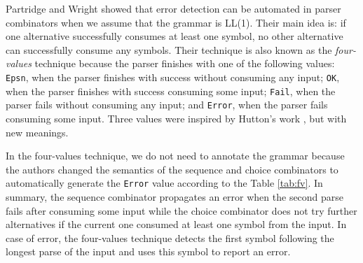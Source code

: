 \documentclass[3p,12pt,singlecolumn]{elsarticle}
\begin{document}
Partridge and Wright \cite{partridge1996fv} showed that error detection
can be automated in parser combinators when we assume that the grammar
is LL(1).
Their main idea is:
if one alternative successfully consumes at least one symbol,
no other alternative can successfully consume any symbols.
Their technique is also known as the \emph{four-values} technique
because the parser finishes with one of the following values:
\texttt{Epsn}, when the parser finishes with success without
consuming any input;
\texttt{OK}, when the parser finishes with success consuming
some input;
\texttt{Fail}, when the parser fails without consuming any input; and
\texttt{Error}, when the parser fails consuming some input.
Three values were inspired by Hutton's work \cite{hutton1992hfp},
but with new meanings.

In the four-values technique, we do not need to annotate the grammar
because the authors changed the semantics of the sequence and choice
combinators to automatically generate the \texttt{Error} value
according to the Table \ref{tab:fv}.
In summary, the sequence combinator propagates an error when the
second parse fails after consuming some input while
the choice combinator does not try further alternatives
if the current one consumed at least one symbol from the input.
In case of error, the four-values technique detects the first symbol
following the longest parse of the input and uses this symbol to
report an error.
\end{document}
